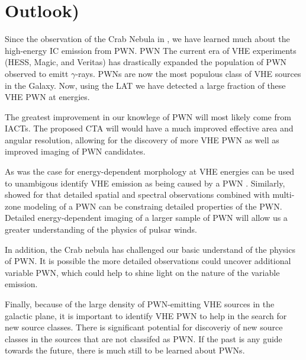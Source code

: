 \chapter{Outlook)}

Since the observation of the Crab Nebula
in \citeyear{weekes_1989a_observation-gamma}
\cite{weekes_1989a_observation-gamma}, we have learned much about the
high-energy \ac{IC} emission from \ac{PWN}. \ac{PWN} The current era of
\ac{VHE} experiments (\ac{HESS}, Magic, and Veritas) has drastically
expanded the population of \ac{PWN} observed to emitt $\gamma$-rays.
\acp{PWN} are now the most populous class of \ac{VHE} sources in the
Galaxy.  Now, using the \ac{LAT} we have detected a large fraction of
these \ac{VHE} \ac{PWN} at \gev energies.

The greatest improvement in our knowlege of \ac{PWN} will most likely come
from \acp{IACT}. The proposed \ac{CTA} \citep{actis_2011a_design-concepts}
will would have a much improved effective area and angular resolution,
allowing for the discovery of more \ac{VHE} \ac{PWN} as well as improved
imaging of \ac{PWN} candidates.

As was the case for  energy-dependent morphology at \ac{VHE}
energies can be used to unambigous identify \ac{VHE} emission as being
caused by a \ac{PWN} \citep{aharonian_2006a_energy-dependent}.  Similarly,
\cite{van-etten_2011a_multi-zone-modeling} showed for  that
detailed spatial and spectral observations combined with multi-zone
modeling of a \ac{PWN} can be constraing detailed properties of
the \ac{PWN}.  Detailed energy-dependent imaging of a larger sample
of \ac{PWN} will allow us a greater understanding of the physics of
pulsar winds.

In addition, the Crab nebula has challenged our basic understand of the
physics of \ac{PWN}. It is possible the more detailed observations could
uncover additional variable \ac{PWN}, which could help to shine light
on the nature of the variable emission.

Finally, because of the large density of \ac{PWN}-emitting \ac{VHE}
sources in the galactic plane, it is important to identify \ac{VHE}
\ac{PWN} to help in the search for new source classes.  There is
significant potential for discoveriy of new source classes in the sources
that are not classifed as \ac{PWN}.  If the past is any guide towards
the future, there is much still to be learned about \acp{PWN}.
